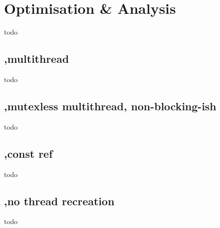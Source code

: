 \documentclass[11pt, a4paper, twocolumn]{article}
\begin{document}
\section{Optimisation \& Analysis}

todo


\subsection{,multithread}

todo

\subsection{,mutexless multithread, non-blocking-ish}

todo

\subsection{,const ref}

todo

\subsection{,no thread recreation}

todo
\end{document}
